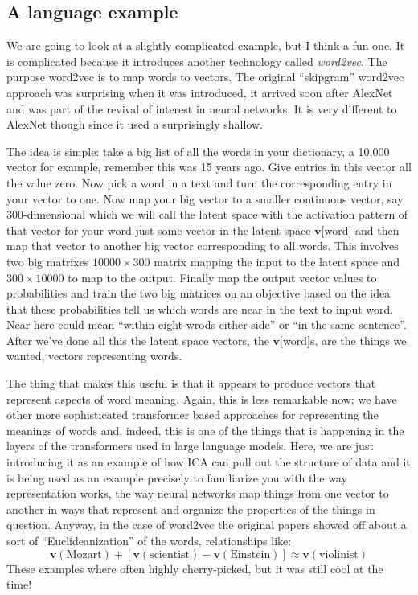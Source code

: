 \documentclass[12pt]{article}
\begin{document}
\subsection*{A language example}

We are going to look at a slightly complicated example, but I think a
fun one. It is complicated because it introduces another technology
called \textsl{word2vec}. The purpose word2vec is to map words to
vectors. The original ``skipgram'' word2vec approach was surprising
when it was introduced, it arrived soon after AlexNet and was part of
the revival of interest in neural networks. It is very different to
AlexNet though since it used a surprisingly shallow.

The idea is simple: take a big list of all the words in your
dictionary, a 10,000 vector for example, remember this was 15 years
ago. Give entries in this vector all the value zero. Now pick a word
in a text and turn the corresponding entry in your vector to one. Now
map your big vector to a smaller continuous vector, say
300-dimensional which we will call the latent space with the
activation pattern of that vector for your word just some vector in
the latent space $\mathbf{v}[$word$]$ and then map that vector to
another big vector corresponding to all words. This involves two big
matrixes $10000\times300$ matrix mapping the input to the latent space
and $300\times 10000$ to map to the output. Finally map the output
vector values to probabilities and train the two big matrices on an
objective based on the idea that these probabilities tell us which
words are near in the text to input word. Near here could mean
``within eight-wrods either side'' or ``in the same sentence''. After
we've done all this the latent space vectors, the
$\mathbf{v}[$word$]$s, are the things we wanted, vectors representing
words.

The thing that makes this useful is that it appears to produce vectors
that represent aspects of word meaning. Again, this is less remarkable
now; we have other more sophisticated transformer based approaches for
representing the meanings of words and, indeed, this is one of the
things that is happening in the layers of the transformers used in
large language models. Here, we are just introducing it as an example
of how ICA can pull out the structure of data and it is being used as
an example precisely to familiarize you with the way representation
works, the way neural networks map things from one vector to another
in ways that represent and organize the properties of the things in
question. Anyway, in the case of word2vec the original papers showed off about a sort of ``Euclideanization'' of the words, relationships like:
\begin{equation}
  \mathbf{v}(\text{Mozart})+[\mathbf{v}(\text{scientist})-\mathbf{v}(\text{Einstein})]\approx\mathbf{v}(\text{violinist})
\end{equation}
These examples where often highly cherry-picked, but it was still cool
at the time!
\end{document}
